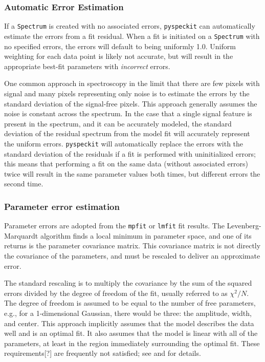 \documentclass[twocolumn]{aastex61}
\newcommand{\pyspeckit}{\texttt{pyspeckit}\xspace}
\begin{document}
\subsubsection{Automatic Error Estimation}
If a \texttt{Spectrum} is created with no associated errors, \pyspeckit can automatically
estimate the errors from a fit residual. When a fit is initiated on a \texttt{Spectrum}
with no specified errors, the errors will default to being uniformly 1.0. Uniform
weighting for each data point is likely not accurate, but will result in the appropriate 
best-fit parameters with \emph{incorrect} errors.

One common approach in spectroscopy in the limit that there are few pixels with
signal and many pixels representing only noise is to estimate the errors by the
standard deviation of the signal-free pixels.  This approach generally assumes
the noise is constant across the spectrum.  In the case that a single signal
feature is present in the spectrum, and it can be accurately modeled, the
standard deviation of the residual spectrum from the model fit will accurately
represent the uniform errors.  \pyspeckit will automatically replace the errors
with the standard deviation of the residuals if a fit is performed with
uninitialized errors; this means that performing a fit on the same data
(without associated errors) twice will result in the same parameter values both
times, but different errors the second time.


\subsubsection{Parameter error estimation}
\label{sec:parerrest}
Parameter errors are adopted from the \texttt{mpfit} or \texttt{lmfit}
fit results.  The Levenberg-Marquardt algorithm
 finds a local minimum in parameter space,
and one of its returns is the parameter covariance matrix.  This covariance
matrix is not directly the covariance of the parameters, and must be rescaled
to deliver an approximate error.

The standard rescaling is to multiply the covariance by the sum of the squared
errors divided by the degree of freedom of the fit, usually referred to
as $\chi^2/N$.  The degree of freedom is assumed to be equal to the number
of free parameters, e.g., for a 1-dimensional Gaussian, there would be three:
the amplitude, width, and center.  This approach implicitly assumes that the
model describes the data well and is an optimal fit.  It also assumes that
the model is linear with all of the parameters, at least in the region immediately
surrounding the optimal fit.  These requirements[?] are frequently not satisfied;
see \citet{Andrae2010a} and \citet{Andrae2010b} for details.
\end{document}
